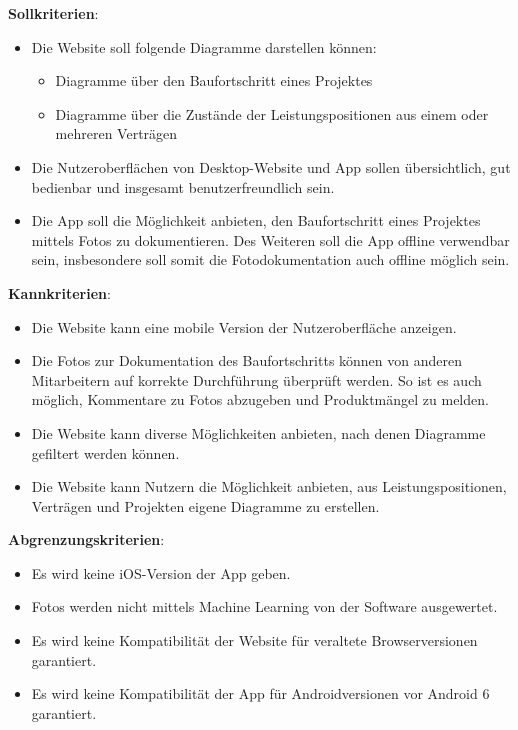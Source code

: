 \textbf{Sollkriterien}:
\begin{itemize}
	\item Die Website soll folgende Diagramme darstellen können:
		\begin{itemize}
		\item Diagramme über den Baufortschritt eines Projektes
		\item Diagramme über die Zustände der Leistungspositionen aus einem oder mehreren Verträgen
		\end{itemize}
	\item Die Nutzeroberflächen von Desktop-Website und App sollen übersichtlich, gut bedienbar und insgesamt benutzerfreundlich sein.
	\item Die App soll die Möglichkeit anbieten, den Baufortschritt eines Projektes mittels Fotos zu dokumentieren.
	Des Weiteren soll die App offline verwendbar sein, insbesondere soll somit die Fotodokumentation auch offline möglich sein.
\end{itemize}

\textbf{Kannkriterien}:
\begin{itemize}
	\item Die Website kann eine mobile Version der Nutzeroberfläche anzeigen.
	\item Die Fotos zur Dokumentation des Baufortschritts können von anderen Mitarbeitern auf korrekte Durchführung überprüft werden.
	So ist es auch möglich, Kommentare zu Fotos abzugeben und Produktmängel zu melden.
	\item Die Website kann diverse Möglichkeiten anbieten, nach denen Diagramme gefiltert werden können.
	\item Die Website kann Nutzern die Möglichkeit anbieten, aus Leistungspositionen, Verträgen und Projekten eigene Diagramme zu erstellen.
\end{itemize}

\textbf{Abgrenzungskriterien}:
\begin{itemize}
	\item Es wird keine iOS-Version der App geben.
	\item Fotos werden nicht mittels Machine Learning von der Software ausgewertet.
	\item Es wird keine Kompatibilität der Website für veraltete Browserversionen garantiert.
	\item Es wird keine Kompatibilität der App für Androidversionen vor Android 6 garantiert.
\end{itemize}